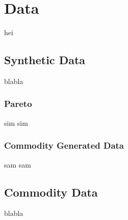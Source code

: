 \chapter[Data]{Data}
hei
\section{Synthetic Data}
blabla
\subsection{Pareto}
sim sim
\subsection{Commodity Generated Data}
sam sam
\section{Commodity Data}
blabla